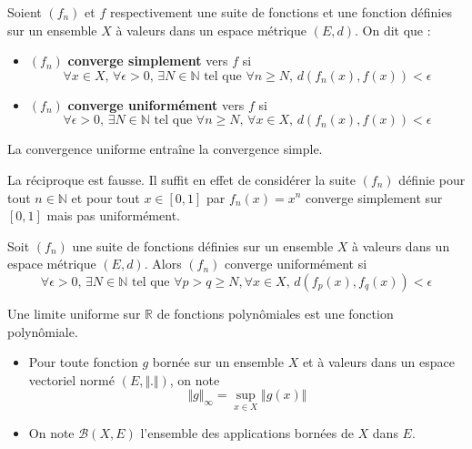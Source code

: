   \begin{definition}
    Soient $(f_n)$ et $f$ respectivement une suite de fonctions et une fonction définies sur un ensemble $X$ à valeurs dans un espace métrique $(E, d)$. On dit que :
    \begin{itemize}
      \item $(f_n)$ \textbf{converge simplement} vers $f$ si
      \[ \forall x \in X, \, \forall \epsilon > 0, \, \exists N \in \mathbb{N} \text{ tel que } \forall n \geq N, \, d(f_n(x), f(x)) < \epsilon \]
      \item $(f_n)$ \textbf{converge uniformément} vers $f$ si
      \[ \forall \epsilon > 0, \, \exists N \in \mathbb{N} \text{ tel que } \forall n \geq N, \, \forall x \in X, \, d(f_n(x), f(x)) < \epsilon \]
    \end{itemize}
  \end{definition}

  \begin{proposition}
    La convergence uniforme entraîne la convergence simple.
  \end{proposition}

  \begin{cexample}
    La réciproque est fausse. Il suffit en effet de considérer la suite $(f_n)$ définie pour tout $n \in \mathbb{N}$ et pour tout $x \in [0,1]$ par $f_n(x) = x^n$ converge simplement sur $[0,1]$ mais pas uniformément.
  \end{cexample}

  \begin{theorem}
    Soit $(f_n)$ une suite de fonctions définies sur un ensemble $X$ à valeurs dans un espace métrique $(E, d)$. Alors $(f_n)$ converge uniformément si
    \[ \forall \epsilon > 0, \, \exists N \in \mathbb{N} \text{ tel que } \forall p > q \geq N, \forall x \in X, \, d(f_p(x), f_q(x)) < \epsilon \]
  \end{theorem}


  \begin{corollary}
    Une limite uniforme sur $\mathbb{R}$ de fonctions polynômiales est une fonction polynômiale.
  \end{corollary}


  \begin{notation}
    \begin{itemize}
      \item Pour toute fonction $g$ bornée sur un ensemble $X$ et à valeurs dans un espace vectoriel normé $(E, \Vert . \Vert)$, on note
      \[ \Vert g \Vert_\infty = \sup_{x \in X} \Vert g(x) \Vert \]
      \item On note $\mathcal{B}(X,E)$ l'ensemble des applications bornées de $X$ dans $E$.
    \end{itemize}
  \end{notation}

